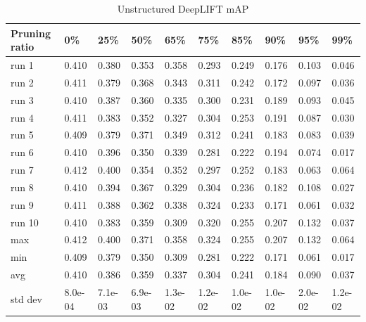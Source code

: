 \documentclass[journal,onecolumn,12pt]{IEEEtran}
\begin{document}
\begin{table}[htbp]
    \caption{Unstructured DeepLIFT mAP}
    \begin{center}
    \begin{tabular}{ |p{2cm}|p{1cm}|p{1cm}|p{1cm}|p{1cm}|p{1cm}|p{1cm}|p{1cm}|p{1cm}|p{1cm}|  }
     \hline
     Pruning ratio  & 0\% & 25\%& 50\%& 65\%& 75\%& 85\%& 90\%& 95\%& 99\%\\
     \hline
        run 1 & 0.410& 0.380& 0.353& 0.358& 0.293& 0.249& 0.176& 0.103& 0.046\\
        run 2 & 0.411& 0.379& 0.368& 0.343& 0.311& 0.242& 0.172& 0.097& 0.036\\
        run 3 & 0.410& 0.387& 0.360& 0.335& 0.300& 0.231& 0.189& 0.093& 0.045\\
        run 4 & 0.411& 0.383& 0.352& 0.327& 0.304& 0.253& 0.191& 0.087& 0.030\\
        run 5 & 0.409& 0.379& 0.371& 0.349& 0.312& 0.241& 0.183& 0.083& 0.039\\
        run 6 & 0.410& 0.396& 0.350& 0.339& 0.281& 0.222& 0.194& 0.074& 0.017\\
        run 7 & 0.412& 0.400& 0.354& 0.352& 0.297& 0.252& 0.183& 0.063& 0.064\\
        run 8 & 0.410& 0.394& 0.367& 0.329& 0.304& 0.236& 0.182& 0.108& 0.027\\
        run 9 & 0.411& 0.388& 0.362& 0.338& 0.324& 0.233& 0.171& 0.061& 0.032\\
        run 10 & 0.410& 0.383& 0.359& 0.309& 0.320& 0.255& 0.207& 0.132& 0.037\\
     \hline
        max     & 0.412 &0.400 &  0.371& 0.358 &0.324& 0.255 &0.207 &0.132& 0.064\\
        min     & 0.409 &0.379 &0.350 & 0.309 &0.281& 0.222 &0.171 &0.061& 0.017\\
        avg     & 0.410 &0.386 &0.359& 0.337& 0.304 &0.241 &0.184& 0.090 &0.037\\
        std dev & 8.0e-04 &7.1e-03 &6.9e-03& 1.3e-02 &1.2e-02& 1.0e-02& 1.0e-02& 2.0e-02 &1.2e-02\\
     \hline
    \end{tabular}
    \end{center}
    \label{tab:a1}
\end{table}
\end{document}
